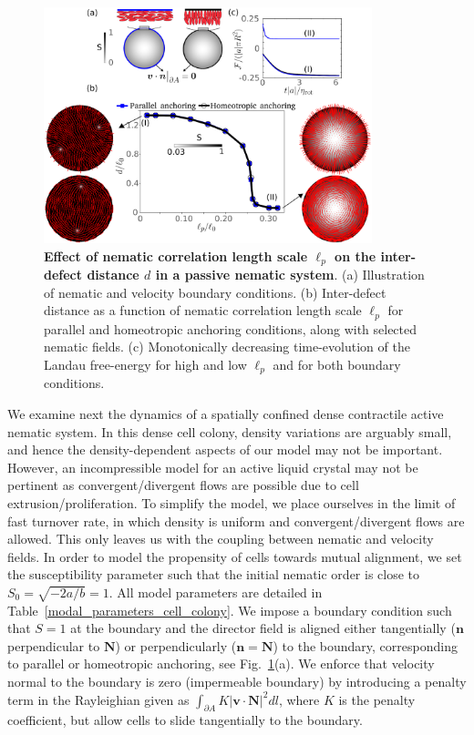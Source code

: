 \documentclass[12pt]{iopart}
\begin{document}
	\begin{figure}[t]
		\centering
		\includegraphics[width=0.85\textwidth]{fig3.eps}
		\caption{\label{sec_1_chap_3_fig_3} \textbf{Effect of nematic correlation length scale $\ell_p$ on the inter-defect distance $d$ in a passive nematic system}. (a) Illustration of nematic and velocity boundary conditions. (b) Inter-defect distance as a function of nematic correlation length scale $\ell_p$ for parallel and homeotropic anchoring conditions, along with selected nematic fields. (c) Monotonically decreasing time-evolution of the Landau free-energy for high and low $\ell_p$ and for both boundary conditions.}
	\end{figure}
	
	We examine next the dynamics of a spatially confined dense contractile active nematic system. In this dense cell colony, density variations are arguably small, and hence the density-dependent aspects of our model may not be important. However, an incompressible model for an active liquid crystal may not be pertinent as convergent/divergent flows are possible due to cell extrusion/proliferation. To simplify the model, we place ourselves in the limit of fast turnover rate, in which density is uniform and convergent/divergent flows are allowed. This only leaves us with the coupling between nematic and velocity fields. In order to model the propensity of cells towards mutual alignment, we set the susceptibility parameter such that the initial nematic order is close to $S_0=\sqrt{-2a/b}=1$. All model parameters are detailed in Table~\ref{modal_parameters_cell_colony}. We impose a boundary condition such that $S=1$ at the boundary and the director field is aligned either tangentially ($\bm{n}$ perpendicular to  $\bm{N}$) or perpendicularly ($\bm{n} = \bm{N}$) to the boundary, corresponding to parallel or homeotropic anchoring, see Fig.~\ref{sec_1_chap_3_fig_3}(a). We enforce that velocity normal to the boundary is zero (impermeable boundary) by introducing a penalty term in the Rayleighian given as  $\int_{\partial A} K \left|\bm{v} \cdot \bm{N}\right|^2 dl$, where $K$ is the penalty coefficient, but allow cells to slide tangentially to the boundary.
	
\end{document}
